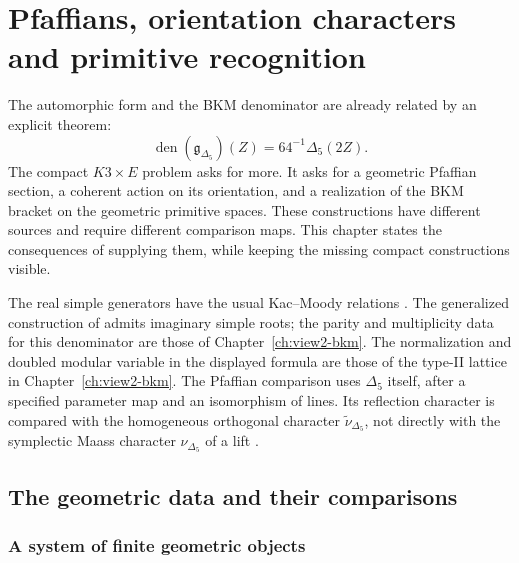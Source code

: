 \chapter{Pfaffians, orientation characters and primitive recognition}
\label{ch:pfaffian-dirac}

The automorphic form and the BKM denominator are already related by
an explicit theorem:
\[
 \operatorname{den}(\mathfrak g_{\Delta_5})(Z)
 =64^{-1}\Delta_5(2Z).
\]
The compact \(K3\times E\) problem asks for more.  It asks for a
geometric Pfaffian section, a coherent action on its orientation,
and a realization of the BKM bracket on the geometric primitive
spaces.  These constructions have different sources and require
different comparison maps.  This chapter states the consequences
of supplying them, while keeping the missing compact constructions
visible.

The real simple generators have the usual Kac--Moody relations
\cite{KAC:1}.  The generalized construction of \cite{BorcherdsGKM88}
admits imaginary simple roots; the parity and multiplicity data for
this denominator are those of Chapter~\ref{ch:view2-bkm}.
The normalization and doubled modular
variable in the displayed formula are those of the type-II lattice in
Chapter~\ref{ch:view2-bkm}.  The Pfaffian comparison uses
\(\Delta_5\) itself, after a specified parameter map and an
isomorphism of lines.  Its reflection character is compared with
the homogeneous orthogonal character
\(\widetilde\nu_{\Delta_5}\), not directly with the symplectic
Maass character \(\nu_{\Delta_5}\) of a lift \cite{MAASS:1}.

\section{The geometric data and their comparisons}
\label{sec:ch6-data}

\subsection{A system of finite geometric objects}
\label{subsec:ch6-pro-object}

